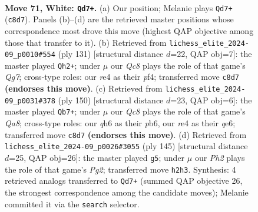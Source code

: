 \documentclass[11pt]{article}
\begin{document}
\clearpage

\begin{figure}[p]\centering
\begin{subfigure}{0.46\textwidth}\centering
\resizebox{\linewidth}{!}{%
\newchessgame
\chessboard[
  setfen={2Q5/7k/5p1q/3p4/4r3/6P1/6KP/8 w - - 22 71},
  showmover=false,
  pgfstyle=straightmove, color=movearrow, markmove={c8-d7}
]}
\caption{}
\end{subfigure}\hfill
\begin{subfigure}{0.46\textwidth}\centering
\resizebox{\linewidth}{!}{%
\newchessgame
\chessboard[
  setfen={8/7k/1p3Pp1/1Q6/5P1K/3P4/6q1/8 b - - 6 66},
  showmover=false,
  pgfstyle=straightmove, color=movearrow, markmove={g2-h2}
]}
\caption{}
\end{subfigure}
\\[4pt]
\begin{subfigure}{0.46\textwidth}\centering
\resizebox{\linewidth}{!}{%
\newchessgame
\chessboard[
  setfen={Q7/3k4/1p2qpp1/1PP5/1K6/8/8/8 w - - 7 76},
  showmover=false,
  pgfstyle=straightmove, color=movearrow, markmove={a8-b7}
]}
\caption{}
\end{subfigure}\hfill
\begin{subfigure}{0.46\textwidth}\centering
\resizebox{\linewidth}{!}{%
\newchessgame
\chessboard[
  setfen={5R2/6p1/7p/7k/8/6Q1/6PK/8 b - - 1 73},
  showmover=false,
  pgfstyle=straightmove, color=movearrow, markmove={g7-g5}
]}
\caption{}
\end{subfigure}
\caption{\textbf{Move 71, White: \texttt{Qd7+}.} (a) Our position; Melanie plays \texttt{Qd7+} (\texttt{c8d7}). Panels (b)--(d) are the retrieved master positions whose correspondence most drove this move (highest QAP objective among those that transfer to it). (b) Retrieved from \texttt{lichess\_elite\_2024-09\_p0010\#554} (ply 131) [structural distance $d$=22, QAP obj=7]: the master played \texttt{Qh2+}; under $\mu$ our \emph{Qc8} plays the role of that game's \emph{Qg7}; cross-type roles: our \emph{r}e4 as their \emph{p}f4; transferred move \texttt{c8d7} \textbf{(endorses this move)}. (c) Retrieved from \texttt{lichess\_elite\_2024-09\_p0031\#378} (ply 150) [structural distance $d$=23, QAP obj=6]: the master played \texttt{Qb7+}; under $\mu$ our \emph{Qc8} plays the role of that game's \emph{Qa8}; cross-type roles: our \emph{q}h6 as their \emph{p}b6, our \emph{r}e4 as their \emph{q}e6; transferred move \texttt{c8d7} \textbf{(endorses this move)}. (d) Retrieved from \texttt{lichess\_elite\_2024-09\_p0026\#3055} (ply 145) [structural distance $d$=25, QAP obj=26]: the master played \texttt{g5}; under $\mu$ our \emph{Ph2} plays the role of that game's \emph{Pg2}; transferred move \texttt{h2h3}. Synthesis: 4 retrieved analogs transferred to \texttt{Qd7+} (summed QAP objective 26, the strongest correspondence among the candidate moves); Melanie committed it via the \texttt{search} selector.}
\label{fig:thought-m140}
\end{figure}
\end{document}

